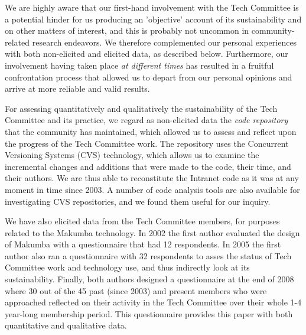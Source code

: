 \documentclass{acm_proc_article-sp}
\begin{document}
We are highly aware that our first-hand involvement with the Tech Committee is a potential hinder for us producing an 'objective' account of its sustainability and on other matters of interest, and this is probably not uncommon in community-related research endeavors. We therefore complemented our personal experiences with both non-elicited and elicited data, as described below. Furthermore, our involvement having taken place {\it at different times} has resulted in a fruitful confrontation process that allowed us to depart from our personal opinions and arrive at more reliable and valid results.

For assessing quantitatively and qualitatively the sustainability of the Tech Committee and its practice, we regard as non-elicited data the {\it code repository} that the community has maintained, which allowed us to assess and reflect upon the progress of the Tech Committee work. The repository uses the Concurrent Versioning Systems (CVS) technology, which allows us to examine the incremental changes and additions that were made to the code, their time, and their authors. We are thus able to reconstitute the Intranet code as it was at any moment in time since 2003. A number of code analysis tools are also available for investigating CVS repositories, and we found them useful for our inquiry.

We have also elicited data from the Tech Committee members, for purposes related to the Makumba technology. In 2002 the first author evaluated the design of Makumba with a questionnaire that had 12 respondents. In 2005 the first author also ran a questionnaire with 32 respondents to asses the status of Tech Committee work and technology use, and thus indirectly look at its sustainability. Finally, both authors designed a questionnaire at the end of 2008 where 30 out of the 45 past (since 2003) and present members who were approached reflected on their activity in the Tech Committee over their whole 1-4 year-long membership period. This questionnaire provides this paper with both quantitative and qualitative data. 
\end{document}

